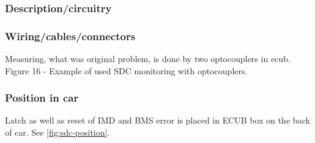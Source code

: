 \subsubsection{Description/circuitry}

\subsubsection{Wiring/cables/connectors}
\iffalse Describe wiring, show schematics, describe connectors and cables used and show useful data regarding the wiring.  If not detailed in section 2.1, be sure to show how the device opens the shutdown circuit.\fi
Measuring, what was original problem, is done by two optocouplers in \gls{ecub}. Figure 16 - Example of used SDC monitoring with optocouplers.
\subsubsection{Position in car}
Latch as well as reset of IMD and BMS error is placed in ECUB box on the back of car. See \ref{fig:sdc-position}.